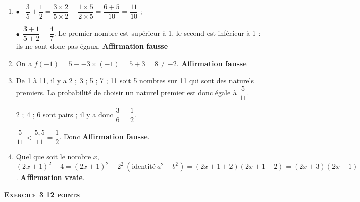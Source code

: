 \documentclass[10pt]{article}
\begin{document}
\begin{enumerate}[itemsep=5mm]
	\item %
$\bullet~~$ $\dfrac{3}{5} + \dfrac{1}{2}  = \dfrac{3\times 2}{5\times 2} + \dfrac{1\times 5}{2\times 5} = \dfrac{6 + 5}{10} = \dfrac{11}{10}$ ;

$\bullet~~$$\dfrac{3 + 1}{5 + 2} = \dfrac{4}{7}$.
Le premier nombre est supérieur à 1, le second est inférieur à 1 : ils ne sont donc pas égaux. \hfill \textbf{Affirmation fausse}	
	\item %
		
On a $f(- 1) = 5 - - 3\times (- 1) = 5 + 3 = 8 \ne - 2$. \hfill \textbf{Affirmation fausse}

	\item %
	

De 1 à 11, il y a 2 ; 3 ; 5 ; 7 ; 11 soit 5 nombres sur 11 qui sont des naturels premiers. La probabilité de choisir un naturel premier est donc égale à $\dfrac{5}{11}$.

2 ; 4 ; 6 sont pairs  ; il y a donc $\dfrac{3}{6} = \dfrac{1}{2}$.

$\dfrac{5}{11} < \dfrac{5,5}{11} = \dfrac{1}{2}$. Donc \hfill \textbf{Affirmation fausse}.	
	\item %
	Quel que soit le nombre $x$, \: $(2x + 1)^2 - 4 = (2x + 1)^2 - 2^2\: \left(\text{identité}\: a^2 - b^2\right) = (2x + 1 + 2)(2x + 1- 2) = (2x + 3)(2x - 1)$. \hfill \textbf{Affirmation vraie}.
\end{enumerate}
\bigskip

\textbf{\textsc{Exercice 3 \hfill 12 points}}
\end{document}
